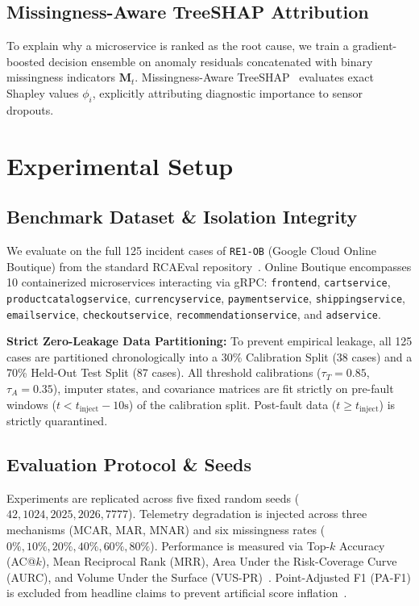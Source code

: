 \documentclass[conference]{IEEEtran}
\begin{document}
\subsection{Missingness-Aware TreeSHAP Attribution}
To explain why a microservice is ranked as the root cause, we train a gradient-boosted decision ensemble on anomaly residuals concatenated with binary missingness indicators $\mathbf{M}_t$. Missingness-Aware TreeSHAP~\cite{lundberg2020local} evaluates exact Shapley values $\phi_i$, explicitly attributing diagnostic importance to sensor dropouts.

\section{Experimental Setup}

\subsection{Benchmark Dataset \& Isolation Integrity}
We evaluate on the full 125 incident cases of \texttt{RE1-OB} (Google Cloud Online Boutique) from the standard RCAEval repository~\cite{pham2025rcaeval}. Online Boutique encompasses 10 containerized microservices interacting via gRPC: \texttt{frontend}, \texttt{cartservice}, \texttt{productcatalogservice}, \texttt{currencyservice}, \texttt{paymentservice}, \texttt{shippingservice}, \texttt{emailservice}, \texttt{checkoutservice}, \texttt{recommendationservice}, and \texttt{adservice}. 

\textbf{Strict Zero-Leakage Data Partitioning:} To prevent empirical leakage, all 125 cases are partitioned chronologically into a 30\% Calibration Split (38 cases) and a 70\% Held-Out Test Split (87 cases). All threshold calibrations ($\tau_T = 0.85$, $\tau_A = 0.35$), imputer states, and covariance matrices are fit strictly on pre-fault windows ($t < t_{\text{inject}} - 10\text{s}$) of the calibration split. Post-fault data ($t \ge t_{\text{inject}}$) is strictly quarantined.

\subsection{Evaluation Protocol \& Seeds}
Experiments are replicated across five fixed random seeds ($42, 1024, 2025, 2026, 7777$). Telemetry degradation is injected across three mechanisms (MCAR, MAR, MNAR) and six missingness rates ($0\%, 10\%, 20\%, 40\%, 60\%, 80\%$). Performance is measured via Top-$k$ Accuracy (AC@$k$), Mean Reciprocal Rank (MRR), Area Under the Risk-Coverage Curve (AURC), and Volume Under the Surface (VUS-PR)~\cite{paparrizos2022vus}. Point-Adjusted F1 (PA-F1) is excluded from headline claims to prevent artificial score inflation~\cite{wu2021current}.
\end{document}
